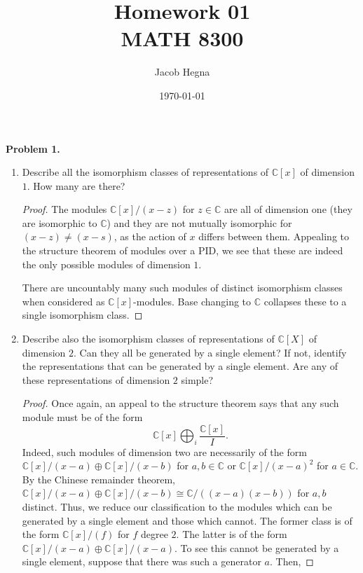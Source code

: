 \documentclass[reqno]{amsart}
\title{Homework 01\\MATH 8300}
\author{Jacob Hegna}
\date{\today}
\theoremstyle{definition}
\theoremstyle{remark}
\newcommand{\prob}[1] {
  \textbf{Problem #1.}
}
\begin{document}
\maketitle

\prob{1}
\begin{enumerate}
  \item Describe all the isomorphism classes of representations of
    $\mathbb{C}[x]$ of dimension $1$. How many are there?
    \begin{proof}
      The modules $\mathbb{C}[x]/(x-z)$ for $z \in \mathbb{C}$ are all of
      dimension one (they are isomorphic to $\mathbb{C}$) and they are not
      mutually isomorphic for $(x-z) \neq (x-s)$, as the action of $x$ differs
      between them. Appealing to the structure theorem of modules over a PID, we
      see that these are indeed the only possible modules of dimension $1$.

      There are uncountably many such modules of distinct isomorphism classes
      when considered as $\mathbb{C}[x]$-modules. Base changing to $\mathbb{C}$
      collapses these to a single isomorphism class.
    \end{proof}

  \item Describe also the isomorphism classes of representations of
    $\mathbb{C}[X]$ of dimension $2$. Can they all be generated by a single
    element? If not, identify the representations that can be generated by a
    single element. Are any of these representations of dimension $2$ simple?

    \begin{proof}
      Once again, an appeal to the structure theorem says that any such module
      must be of the form
      \[
        \mathbb{C}[x] \bigoplus_i \frac{\mathbb{C}[x]}{I}.
      \]
      Indeed, such modules of dimension two are necessarily of the form
      $\mathbb{C}[x]/(x-a) \oplus \mathbb{C}[x]/(x-b)$ for $a, b \in \mathbb{C}$
      or $\mathbb{C}[x]/(x-a)^2$ for $a \in \mathbb{C}$. By the Chinese
      remainder theorem, $\mathbb{C}[x]/(x-a) \oplus \mathbb{C}[x]/(x-b) \cong
      \mathbb{C}/\left((x-a)(x-b)\right)$ for $a, b$ distinct. Thus, we reduce
      our classification to the modules which can be generated by a single
      element and those which cannot. The former class is of the form
      $\mathbb{C}[x]/(f)$ for $f$ degree $2$. The latter is of the form
      $\mathbb{C}[x]/(x-a) \oplus \mathbb{C}[x]/(x-a)$. To see this cannot be
      generated by a single element, suppose that there was such a generator
      $a$. Then, 
    \end{proof}
\end{enumerate}
\end{document}
